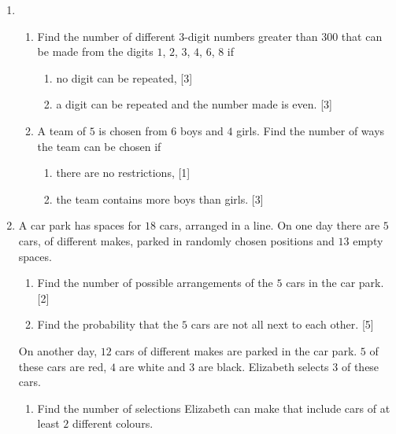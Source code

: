 \documentclass[a4paper]{article}
\begin{document}
\begin{enumerate}
	\item  \begin{enumerate}[label=(\roman*)]
		\item Find the number of different $3$-digit numbers greater than 300 that can be made from the digits $1$, $2$, $3$, $4$, $6$, $8$ if
		\begin{enumerate}[label=(\alph*)]
			\item no digit can be repeated, \hfill[3]
			\vspace{2cm}
			\item a digit can be repeated and the number made is even. \hfill[3]
			\vspace{2cm}
		\end{enumerate}
		\item  A team of $5$ is chosen from $6$ boys and $4$ girls. Find the number of ways the team can be chosen if 
		\begin{enumerate}[label=(\alph*)]
			\item there are no restrictions, \hfill[1]
			\vspace{2cm}
			\item the team contains more boys than girls. \hfill[3]
			\vspace{2cm}
		\end{enumerate}
	\end{enumerate}
	
	
	
	
	
	\item  A car park has spaces for $18$ cars, arranged in a line. On one day there are $5$ cars, of different makes, parked in randomly chosen positions and $13$ empty spaces.
	
	\begin{enumerate}[label=(\roman*)]
		\item Find the number of possible arrangements of the $5$ cars in the car park. \hfill[2]
		\vspace{2cm}
		\item Find the probability that the $5$ cars are not all next to each other. \hfill[5]
		\vspace{2cm}
	\end{enumerate}
	On another day, $12$ cars of different makes are parked in the car park. $5$ of these cars are red, $4$ are white and $3$ are black. Elizabeth selects $3$ of these cars.
	\begin{enumerate}[resume,label=(\roman*)]
		\item Find the number of selections Elizabeth can make that include cars of at least $2$ different colours. 
		

\end{enumerate}
\end{enumerate}
\end{document}
